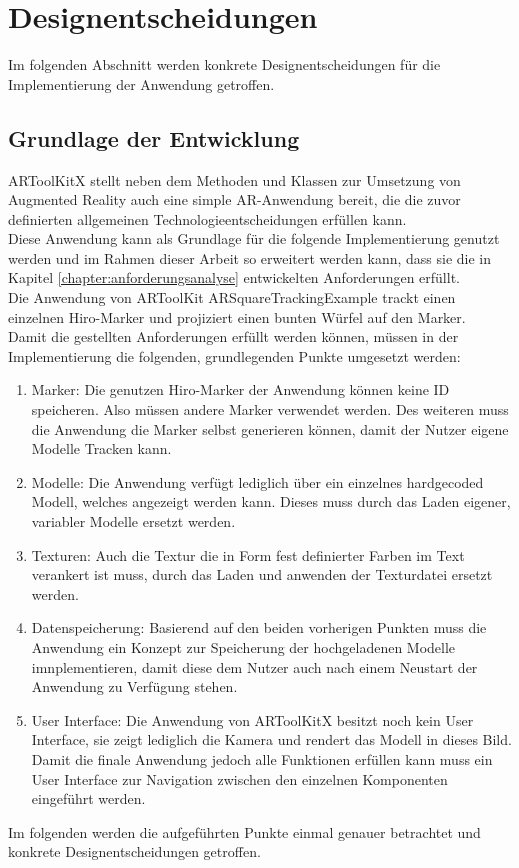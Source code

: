 \section{Designentscheidungen}
Im folgenden Abschnitt werden konkrete Designentscheidungen für die Implementierung der Anwendung getroffen.

\subsection{Grundlage der Entwicklung}
ARToolKitX stellt neben dem Methoden und Klassen zur Umsetzung von Augmented Reality auch eine simple AR-Anwendung bereit, die die zuvor definierten allgemeinen Technologieentscheidungen erfüllen kann.\\
Diese Anwendung kann als Grundlage für die folgende Implementierung genutzt werden und im Rahmen dieser Arbeit so erweitert werden kann, dass sie die in Kapitel \ref{chapter:anforderungsanalyse} entwickelten Anforderungen erfüllt.\\ 
Die Anwendung von ARToolKit \glqq ARSquareTrackingExample\grqq{} trackt einen einzelnen Hiro-Marker und projiziert einen bunten Würfel auf den Marker. \\
Damit die gestellten Anforderungen erfüllt werden können, müssen in der Implementierung die folgenden, grundlegenden Punkte umgesetzt werden:
\begin{enumerate}
\item Marker: Die genutzen Hiro-Marker der Anwendung können keine ID speicheren. Also müssen andere Marker verwendet werden. Des weiteren muss die Anwendung die Marker selbst generieren können, damit der Nutzer eigene Modelle Tracken kann.

\item Modelle: Die Anwendung verfügt lediglich über ein einzelnes hardgecoded Modell, welches angezeigt werden kann. Dieses muss durch das Laden eigener, variabler Modelle ersetzt werden.

\item Texturen:  Auch die Textur die in Form fest definierter Farben im Text verankert ist muss, durch das Laden und anwenden der Texturdatei ersetzt werden.

\item Datenspeicherung: Basierend auf den beiden vorherigen Punkten muss die Anwendung ein Konzept zur Speicherung der hochgeladenen Modelle imnplementieren, damit diese dem Nutzer auch nach einem Neustart der Anwendung zu Verfügung stehen.

\item User Interface: Die Anwendung von ARToolKitX besitzt noch kein User Interface, sie zeigt lediglich die Kamera und rendert das Modell in dieses Bild. Damit die finale Anwendung jedoch alle Funktionen erfüllen kann muss ein User Interface zur Navigation zwischen den einzelnen Komponenten eingeführt werden.
\end{enumerate}
Im folgenden werden die aufgeführten Punkte einmal genauer betrachtet und konkrete Designentscheidungen getroffen.

